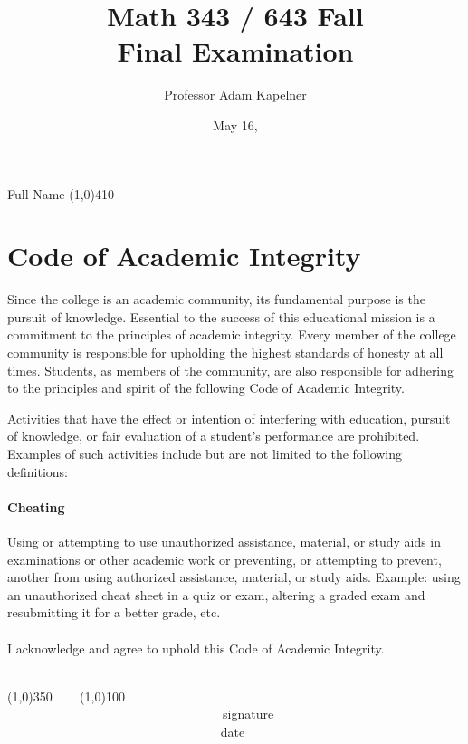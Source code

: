 \documentclass[12pt]{article}
\title{Math 343 / 643 Fall \the\year{} \\ Final Examination}
\author{Professor Adam Kapelner}
\date{May 16, \the\year{}}
\begin{document}
\maketitle

\noindent Full Name \line(1,0){410}

\thispagestyle{empty}

\section*{Code of Academic Integrity}

\footnotesize
Since the college is an academic community, its fundamental purpose is the pursuit of knowledge. Essential to the success of this educational mission is a commitment to the principles of academic integrity. Every member of the college community is responsible for upholding the highest standards of honesty at all times. Students, as members of the community, are also responsible for adhering to the principles and spirit of the following Code of Academic Integrity.

Activities that have the effect or intention of interfering with education, pursuit of knowledge, or fair evaluation of a student's performance are prohibited. Examples of such activities include but are not limited to the following definitions:

\paragraph{Cheating} Using or attempting to use unauthorized assistance, material, or study aids in examinations or other academic work or preventing, or attempting to prevent, another from using authorized assistance, material, or study aids. Example: using an unauthorized cheat sheet in a quiz or exam, altering a graded exam and resubmitting it for a better grade, etc.\\
\\
\noindent I acknowledge and agree to uphold this Code of Academic Integrity. \\~\\

\begin{center}
\line(1,0){350} ~~~ \line(1,0){100}\\
~~~~~~~~~~~~~~~~~~~~~~~~~~~~~~~~~~signature~~~~~~~~~~~~~~~~~~~~~~~~~~~~~~~~~~~~~~~~~~~~~~~~~~~~~~~~~~~~~~ date
\end{center}

\normalsize
\end{document}
